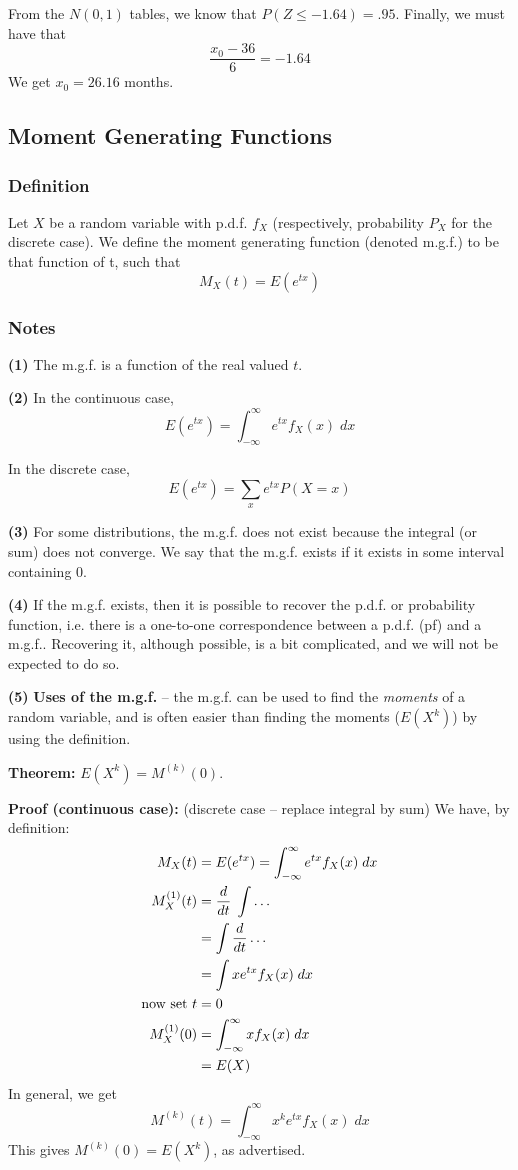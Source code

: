 \documentclass[12pt]{article}
\begin{document}
From the $N(0,1)$ tables, we know that $P(Z \leq -1.64) = .95$. Finally, we must have that
\[
    \frac{x_0 - 36}{6} = -1.64
\]
We get $x_0 = 26.16$ months.

\subsection{Moment Generating Functions}
\subsubsection{Definition}
Let $X$ be a random variable with p.d.f. $f_X$ (respectively, probability $P_X$ for the discrete case). We define the moment generating function (denoted m.g.f.) to be that function of t, such that
\[
    M_X (t) = E ( e^{tx} )
\]

\subsubsection{Notes}
\textbf{(1)} The m.g.f. is a function of the real valued $t$.

\textbf{(2)} In the continuous case, 
\[
    E(e^{tx}) = \int_{-\infty}^{\infty} e^{tx} f_X (x) \; dx
\]

In the discrete case,
\[
    E(e^{tx}) = \sum_x e^{tx} P(X = x)
\]

\textbf{(3)} For some distributions, the m.g.f. does not exist because the integral (or sum) does not converge. We say that the m.g.f. exists if it exists in some interval containing 0. 

\textbf{(4)} If the m.g.f. exists, then it is possible to recover the p.d.f. or probability function, i.e. there is a one-to-one correspondence between a p.d.f. (pf) and a m.g.f.. Recovering it, although possible, is a bit complicated, and we will not be expected to do so.

\textbf{(5)} \textbf{Uses of the m.g.f.} -- the m.g.f. can be used to find the \emph{moments} of a random variable, and is often easier than finding the moments ($E(X^k)$) by using the definition. 

\textbf{Theorem:} $E(X^k) = M^{(k)} (0)$.

\textbf{Proof (continuous case):} (discrete case -- replace integral by sum) We have, by definition:
\begin{align*}
   M_X (t) &= E(e^{tx}) = \int_{-\infty}^{\infty} e^{tx} f_X (x) \; dx \\
   M_X^{(1)} (t) &= \frac{d}{dt} \; \int \ldots \\
    &= \int \frac{d}{dt} \ldots \\
    &= \int x e^{tx} f_X (x) \; dx \\
   \textnormal{now set } t &= 0 \\
   M_X^{(1)} (0) &= \int_{-\infty}^{\infty} x f_X (x) \; dx \\
    &= E(X)
\end{align*}
In general, we get 
\[
    M^{(k)} (t) = \int_{-\infty}^{\infty} x^k e^{tx} f_X (x) \; dx
\]
This gives $M^{(k)} (0) = E(X^k)$, as advertised.
\end{document}

